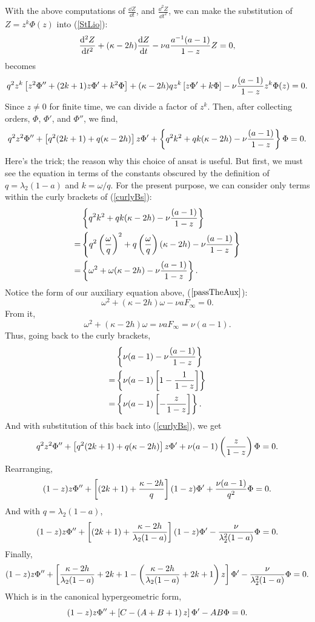 With the above computations of $\frac{\dd Z}{\dd t}$, and $\frac{\dd^2 Z}{\dd t^2}$, we can make the substitution of $Z = z^k\Phi(z)$ into (\ref{StLio}): 
$$\frac{{\rm d}^2 Z}{{\rm d} t^2} + (\kappa - 2h ) \displaystyle\frac{{\rm d} Z}{{\rm d} t} -   \nu a \frac{a^{-1}(a-1)}{1-z} Z = 0, $$
becomes
$$q^2 z^k \left[ z^2 \Phi'' + (2k+1)z\Phi' + k^2\Phi\right]+ (\kappa - 2h ) q z^k \left[ z\Phi' + k\Phi\right]-  \nu  \frac{(a-1)}{1-z} z^k\Phi(z) = 0.$$
Since $z\neq 0$ for finite time, we can divide a factor of $z^k$. Then, after collecting orders, $\Phi$, $\Phi'$, and $\Phi''$, we find,
\begin{equation}
    \label{curlyBs}
    q^2 z^2 \Phi''  + \left[ q^2(2k+1) + q(\kappa - 2h)\right]  z\Phi'  + \left\{ q^2 k^2 + qk(\kappa - 2h) - \nu  \frac{(a-1)}{1-z}\right\} \Phi = 0.
\end{equation}
Here's the trick; the reason why this choice of ansat is useful. But first, we must see the equation in terms of the constants obscured by the definition of $q = \lambda_2 (1-a)$ and $k = \omega / q$. For the present purpose, we can consider only terms within the curly brackets of  (\ref{curlyBs}): 
\begin{align*}
 &\left\{ q^2 k^2 + qk(\kappa - 2h) - \nu   \frac{(a-1)}{1-z}\right\}\\
 = &\left\{ q^2 \left(\frac{\omega}{q}\right)^2 + q\left(\frac{\omega}{q}\right)(\kappa - 2h) - \nu  \frac{(a-1)}{1-z}\right\}\\
   =&\left\{\omega^2 + \omega(\kappa - 2h) - \nu  \frac{(a-1)}{1-z}\right\}.
\end{align*}
Notice the form of our auxiliary equation above, ($\ref{passTheAux}$):
$$\omega^2 + (\kappa - 2h) \omega - \nu a F_\infty = 0.$$
From it, 
$$\omega^2 + (\kappa - 2h) \omega  =  \nu a F_\infty = \nu (a - 1).$$
Thus, going back to the curly brackets, 
\begin{align*}
   &\left\{\nu (a - 1)- \nu  \frac{(a-1)}{1-z}\right\}\\
   =&\left\{\nu (a - 1)\left[ 1 - \frac{1}{1-z}\right]\right\}\\
   =&\left\{\nu (a - 1)\left[ - \frac{z}{1-z}\right]\right\}.
\end{align*}
And with substitution of this back into (\ref{curlyBs}), we get
$$q^2 z^2 \Phi'' + \left[ q^2(2k+1) + q(\kappa - 2h)\right] z\Phi' + \nu(a-1)\left( \frac{z}{1-z}\right)\Phi = 0.
$$
Rearranging,
$$ (1-z)z \Phi'' + \left[(2k+1) + \frac{\kappa - 2h}{q}  \right](1-z)\Phi' + \frac{\nu(a-1)}{q^2}\Phi = 0.
$$
And with $q = \lambda_2 (1-a)$,
$$ (1-z)z \Phi'' + \left[(2k+1) + \frac{\kappa - 2h}{\lambda_2 (1-a)}  \right](1-z)\Phi' - \frac{\nu}{\lambda_2^2(1-a)}\Phi = 0.
$$
Finally,
$$ (1-z)z \Phi'' + \left[ \frac{\kappa - 2h}{\lambda_2 (1-a)} + 2k+1  - \left(    \frac{\kappa - 2h}{\lambda_2 (1-a)} + 2k+1    \right) z \right]\Phi' - \frac{\nu}{\lambda_2^2(1-a)}\Phi = 0.
$$
Which is in the canonical hypergeometric form, 
$$ (1-z)z \Phi'' + \left[ C  - \left(  A + B + 1  \right) z \right]\Phi' -AB\Phi = 0.
$$



